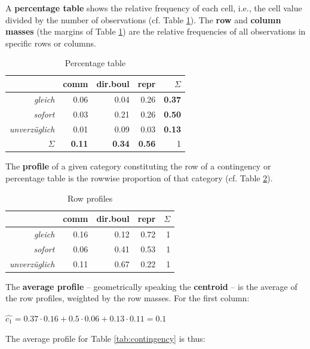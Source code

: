 \begin{paperappendix}
A \textbf{percentage table} shows the relative frequency of each cell,
i.e., the cell value divided by the number of observations (cf. Table
\ref{tab:percentage}).  The \textbf{row} and \textbf{column masses}
(the margins of Table \ref{tab:percentage}) are the relative
frequencies of all observations in specific rows or columns.

\begin{table}[hb]
\centering
\begin{tabular}{r|rrr|r}
  \hline
 & comm & dir.boul & repr & $\Sigma$\\ 
  \hline
  \textit{gleich} & 0.06 & 0.04 & 0.26 & \textbf{0.37}\\ 
  \textit{sofort} & 0.03 & 0.21 & 0.26 & \textbf{0.50}\\ 
  \textit{unverzüglich} & 0.01 & 0.09 & 0.03 & \textbf{0.13}\\ 
  \hline
  $\Sigma$               & \textbf{0.11}   & \textbf{0.34}    &  \textbf{0.56}   &    1\\
\end{tabular}
\caption{Percentage table}
\label{tab:percentage}
\end{table}

The \textbf{profile} of a given category constituting the row of a
contingency or percentage table is the rowwise proportion of that
category (cf. Table \ref{tab:profile}).

\begin{table}[ht]
\centering
\begin{tabular}{r|rrr|r}
  \hline
 & comm & dir.boul & repr & $\Sigma$\\ \hline
  \textit{gleich} & 0.16 & 0.12 & 0.72 & 1\\ 
  \textit{sofort} & 0.06 & 0.41 & 0.53 & 1\\ 
  \textit{unverzüglich} & 0.11 & 0.67 & 0.22 & 1\\ \hline
\end{tabular}
\caption{Row profiles}
\label{tab:profile}
\end{table}

The \textbf{average profile} -- geometrically speaking the
\textbf{centroid} -- is the average of the row profiles, weighted by
the row masses. For the first column:

 \begin{exe}
   \ex $\hat{c_1} = 0.37 \cdot 0.16 + 0.5 \cdot 0.06 + 0.13 \cdot 0.11 = 0.1$
 \end{exe}
%
 The average profile for Table \ref{tab:contingency} is thus:


\end{paperappendix}

